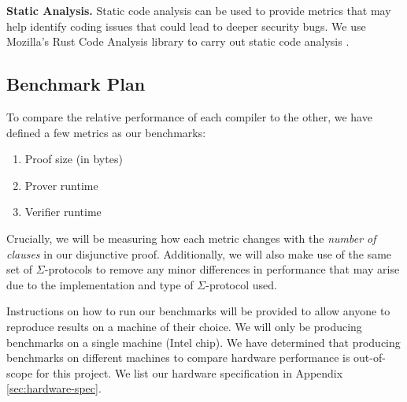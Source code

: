 \textbf{Static Analysis.} Static code analysis can be used to provide metrics that may help identify coding issues that could lead to deeper security bugs. We use Mozilla's Rust Code Analysis library to carry out static code analysis \cite{ARDITO2020100635}.







\subsection{Benchmark Plan}
\label{sec:benchmarks}
To compare the relative performance of each compiler to the other, we have defined a few metrics as our benchmarks:
\begin{enumerate}
    \item Proof size (in bytes)
    \item Prover runtime
    \item Verifier runtime
\end{enumerate}

Crucially, we will be measuring how each metric changes with the \textit{number of clauses} in our disjunctive proof. Additionally, we will also make use of the same set of $\Sigma$-protocols to remove any minor differences in performance that may arise due to the implementation and type of $\Sigma$-protocol used. 

Instructions on how to run our benchmarks will be provided to allow anyone to reproduce results on a machine of their choice. We will only be producing benchmarks on a single machine (Intel chip). We have determined that producing benchmarks on different machines to compare hardware performance is out-of-scope for this project. We list our hardware specification in Appendix \ref{sec:hardware-spec}.